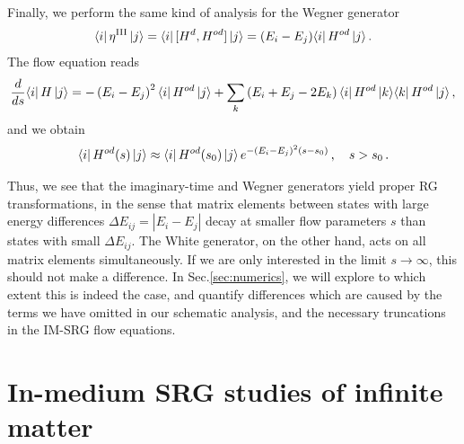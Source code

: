 Finally, we perform the same kind of analysis for the Wegner generator
\begin{equation}
  \langle{i}|\,{\eta^\text{III}}\,|{j}\rangle=\langle{i}|\,{[{H^d},{H^{od}}]}\,|{j}\rangle=(E_i-E_j)\langle{i}|\,{H^{od}}\,|{j}\rangle\,.
\end{equation}
The flow equation reads
\begin{align}
  \totd{}{s}\matrixe{i}{\HO}{j}
  =-\left(E_i-E_j\right)^2\matrixe{i}{\HO^{od}}{j}
  +\sum_k\left(E_i+E_j-2E_k\right)\matrixe{i}{\HO^{od}}{k}\matrixe{k}{\HO^{od}}{j}\,,\label{eq:schema_wegner}
\end{align}
and we obtain
\begin{equation}
  \langle{i}|\,{H^{od}(s)}\,|{j}\rangle \approx \langle{i}|\,{H^{od}(s_0)}\,|{j}\rangle\,e^{-(E_i-E_j)^2 (s-s_0)}\,, \quad s>s_0\,.
\end{equation}

Thus, we see that the imaginary-time and Wegner generators yield
proper RG transformations, in the sense that matrix elements between
states with large energy differences $\Delta E_{ij} = |E_i-E_j|$ decay
at smaller flow parameters $s$ than states with small $\Delta
E_{ij}$. The White generator, on the other hand, acts on all matrix
elements simultaneously. If we are only interested in the limit
$s\to\infty$, this should not make a difference. In
Sec.\ref{sec:numerics}, we will explore to which extent this is indeed
the case, and quantify differences which are caused by the terms we
have omitted in our schematic analysis, and the necessary truncations
in the IM-SRG flow equations.


\section{In-medium SRG studies of infinite matter}

\begin{acknowledgement}

\end{acknowledgement}


















 
